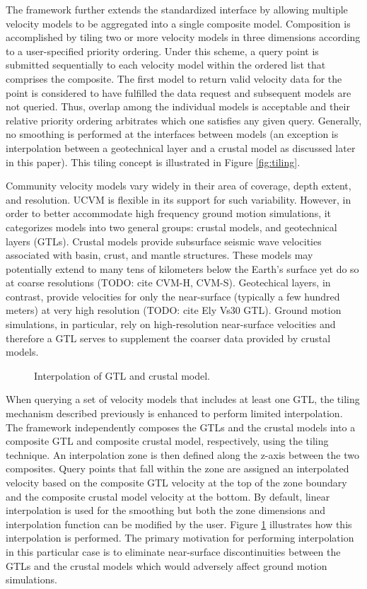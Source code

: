 The framework further extends the standardized interface by allowing multiple velocity models to be aggregated into a single composite model. Composition is accomplished by tiling two or more velocity models in three dimensions according to a user-specified priority ordering. Under this scheme, a query point is submitted sequentially to each velocity model within the ordered list that comprises the composite. The first model to return valid velocity data for the point is considered to have fulfilled the data request and subsequent models are not queried. Thus, overlap among the individual models is acceptable and their relative priority ordering arbitrates which one satisfies any given query. Generally, no smoothing is performed at the interfaces between models (an exception is interpolation between a geotechnical layer and a crustal model as discussed later in this paper). This tiling concept is illustrated in Figure \ref{fig:tiling}.

Community velocity models vary widely in their area of coverage, depth extent, and resolution. UCVM is flexible in its support for such variability. However, in order to better accommodate high frequency ground motion simulations, it categorizes models into two general groups: crustal models, and geotechnical layers (GTLs). Crustal models provide subsurface seismic wave velocities associated with basin, crust, and mantle structures. These models may potentially extend to many tens of kilometers below the Earth's surface yet do so at coarse resolutions (TODO: cite CVM-H, CVM-S). Geotechical layers, in contrast, provide velocities for only the near-surface (typically a few hundred meters) at very high resolution (TODO: cite Ely Vs30 GTL). Ground motion simulations, in particular, rely on high-resolution near-surface velocities and therefore a GTL serves to supplement the coarser data provided by crustal models.
\begin{figure}
\centering
{}
\caption{Interpolation of GTL and crustal model.}\label{fig:interpolation}
\end{figure}

When querying a set of velocity models that includes at least one GTL, the tiling mechanism described previously is enhanced to perform limited interpolation. The framework independently composes the GTLs and the crustal models into a composite GTL and composite crustal model, respectively, using the tiling technique. An interpolation zone is then defined along the z-axis between the two composites. Query points that fall within the zone are assigned an interpolated velocity based on the composite GTL velocity at the top of the zone boundary and the composite crustal model velocity at the bottom. By default, linear interpolation is used for the smoothing but both the zone dimensions and interpolation function can be modified by the user. Figure \ref{fig:interpolation} illustrates how this interpolation is performed. The primary motivation for performing interpolation in this particular case is to eliminate near-surface discontinuities between the GTLs and the crustal models which would adversely affect ground motion simulations.

